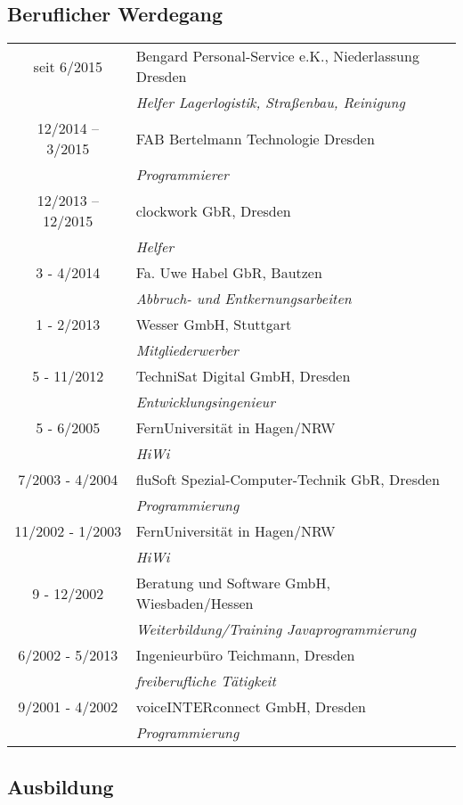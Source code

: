 \documentclass{article}
\begin{document}
\subsection*{Beruflicher Werdegang}
\begin{tabular}{cp{15cm}}
seit 6/2015 	      	& 	Bengard Personal-Service e.K., Niederlassung Dresden\\
	    		& 	\it{Helfer Lagerlogistik, Stra\ss{}enbau, Reinigung}\\
12/2014  --  3/2015 	& FAB Bertelmann Technologie Dresden\\
		  	& \it{Programmierer}\\
12/2013  --  12/2015 	& clockwork GbR, Dresden\\
		   	& \it{Helfer}\\
3 - 4/2014		& Fa. Uwe Habel GbR, Bautzen\\
			& \it{Abbruch- und Entkernungsarbeiten}\\
1 - 2/2013		& Wesser GmbH, Stuttgart\\
			& \it{Mitgliederwerber}\\
5 - 11/2012		& TechniSat Digital GmbH, Dresden\\
			& \it{Entwicklungsingenieur}\\
5 - 6/2005		& FernUniversit\"at in Hagen/NRW\\
			& \it{HiWi}\\
7/2003 - 4/2004		& fluSoft Spezial-Computer-Technik GbR, Dresden\\
			& \it{Programmierung}\\
11/2002 - 1/2003	& FernUniversit\"at in Hagen/NRW\\
			& \it{HiWi}\\
9 - 12/2002		& Beratung und Software GmbH, Wiesbaden/Hessen\\
			& \it{Weiterbildung/Training Javaprogrammierung}\\
6/2002 - 5/2013		& Ingenieurb\"uro Teichmann, Dresden\\
			& \it{freiberufliche T\"atigkeit}\\
9/2001 - 4/2002		& voiceINTERconnect GmbH, Dresden\\
			& \it{Programmierung}\\
\end{tabular}


\subsection*{Ausbildung}
\end{document}
